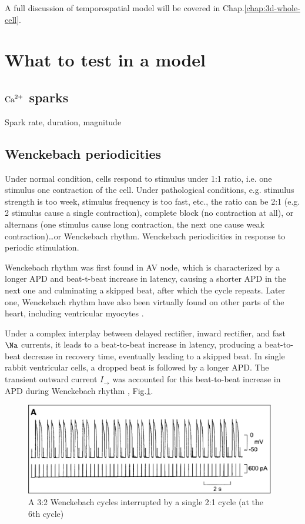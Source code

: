 A full discussion of temporospatial model will be covered in
Chap.\ref{chap:3d-whole-cell}.




\section{What to test in a model}
\label{sec:what-test-model}

\subsection{${\text{Ca}^{2+}}$ sparks}
\label{sec:calcium-sparks}

Spark rate, duration, magnitude




\subsection{Wenckebach periodicities}
\label{sec:wenck-peri}

Under normal condition, cells respond to stimulus under 1:1 ratio, i.e. one
stimulus one contraction of the cell. Under pathological conditions, e.g.
stimulus strength is too week, stimulus frequency is too fast, etc., the ratio
can be 2:1 (e.g. 2 stimulus cause a single contraction), complete block (no
contraction at all), or alternans (one stimulus cause long contraction, the
next one cause weak contraction)\ldots or Wenckebach rhythm. Wenckebach
periodicities in response to periodic stimulation.

Wenckebach rhythm was first found in AV node, which is characterized by a longer
APD and beat-t-beat increase in latency, causing a shorter APD in the next one
and culminating a skipped beat, after which the cycle repeats. Later one,
Wenckebach rhythm have  also been virtually found on other parts of the heart,
including ventricular myocytes \citep{anderson1972}. 

Under a complex interplay between delayed rectifier, inward rectifier, and fast
$\Na$ currents, it leads to a beat-to-beat increase in latency, producing a
beat-to-beat decrease in recovery time, eventually leading to a skipped beat. In
single rabbit ventricular cells, a dropped beat is followed by a longer APD. The
transient outward current $I_\to$ was accounted for this beat-to-beat increase
in APD during Wenckebach rhythm \citep{yehia1997}, Fig.\ref{fig:Wenckebach}.


\begin{figure}[hbt]
  \centerline{\includegraphics[height=4cm,
    angle=0]{./images/Wenckebach_3.2.eps}}
\caption{A 3:2 Wenckebach cycles interrupted by a single 2:1 cycle (at the 6th
cycle)}
\label{fig:Wenckebach}
\end{figure}

